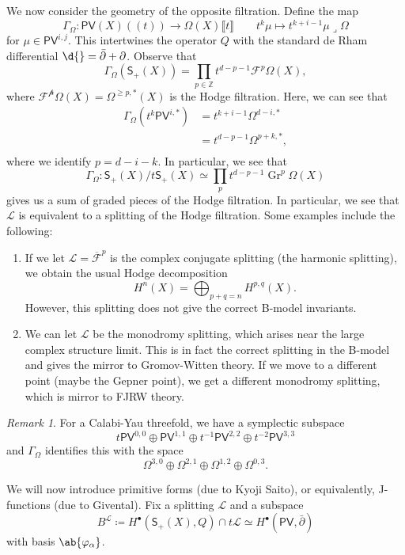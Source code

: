 \documentclass[article,10pt,oneside,oldfontcommands]{memoir}
\theoremstyle{definition}
\theoremstyle{remark}
\newtheorem{rmk}[thm]{Remark}
\theoremstyle{plain}
\theoremstyle{definition}
\theoremstyle{remark}
\newcommand{\Z}{\mathbb{Z}}
\newcommand{\mc}[1]{\mathcal{#1}}
\newcommand{\on}[1]{\operatorname{#1}}
\newcommand{\ms}[1]{\mathsf{#1}}
\newcommand{\ol}[1]{\overline{#1}}
\newcommand{\1}{\mathbf{1}}
\newcommand{\2}{\mathbf{2}}
\newcommand{\3}{\mathbf{3}}
\newcommand{\ps}[1]{\lBrack #1 \rBrack}
\newcommand{\ls}[1]{(\!( #1 )\!)}
\newcommand{\dbar}{\bar{\partial}}
\begin{document}
We now consider the geometry of the opposite filtration. Define the map
\[ \Gamma_{\Omega} \colon \ms{PV}(X)\ls{t} \to \Omega(X)\ps{t} \qquad t^k \mu \mapsto t^{k+i-1} \mu \lrcorner \Omega \]
for \(\mu \in \ms{PV}^{i,j}\). This intertwines the operator \(Q\) with the standard de Rham differential \(\d{} = \dbar + \partial\). Observe that 
\[ \Gamma_{\Omega}(\ms{S}_+(X)) = \prod_{p \in \Z} t^{d-p-1} \mc{F}^p \Omega(X), \]
where \(\mc{F^p}\Omega(X) = \Omega^{\geq p, *}(X)\) is the Hodge filtration. Here, we can see that
\begin{align*}
    \Gamma_{\Omega}(t^k \ms{PV}^{i, *}) &= t^{k+i-1} \Omega^{d-i, *} \\
    &= t^{d-p-1} \Omega^{p+k, *}, \\
\end{align*}
where we identify \(p = d-i-k\). In particular, we see that
\[ \Gamma_{\Omega} \colon \ms{S}_+(X) / t \ms{S}_+(X) \simeq \prod_p t^{d-p-1} \on{Gr}^p \Omega(X) \]
gives us a sum of graded pieces of the Hodge filtration. In particular, we see that \(\mc{L}\) is equivalent to a splitting of the Hodge filtration. Some examples include the following:
\begin{enumerate}
    \item If we let \(\mc{L} = \ol{\mc{F}}^p\) is the complex conjugate splitting (the harmonic splitting), we obtain the usual Hodge decomposition
    \[ H^n(X) = \bigoplus_{p+q=n} H^{p,q}(X). \]
    However, this splitting does not give the correct B-model invariants.
    \item We can let \(\mc{L}\) be the monodromy splitting, which arises near the large complex structure limit. This is in fact the correct splitting in the B-model and gives the mirror to Gromov-Witten theory. If we move to a different point (maybe the Gepner point), we get a different monodromy splitting, which is mirror to FJRW theory.
\end{enumerate}

\begin{rmk}
    For a Calabi-Yau threefold, we have a symplectic subspace
    \[ t \ms{PV}^{0,0} \oplus \ms{PV}^{1,1} \oplus t^{-1} \ms{PV}^{2,2} \oplus t^{-2} \ms{PV}^{3,3} \]
    and \(\Gamma_{\Omega}\) identifies this with the space
    \[ \Omega^{3,0} \oplus \Omega^{2,1} \oplus \Omega^{1,2} \oplus \Omega^{0,3}.\]
\end{rmk}

We will now introduce primitive forms (due to Kyoji Saito), or equivalently, J-functions (due to Givental). Fix a splitting \(\mc{L}\) and a subspace
\[ B^{\mc{L}} \coloneqq H^{\bullet}(\ms{S}_+(X), Q) \cap t \mc{L} \simeq H^{\bullet}(\ms{PV}, \dbar) \]
with basis \(\ab\{\varphi_{\alpha}\}\).
\end{document}
